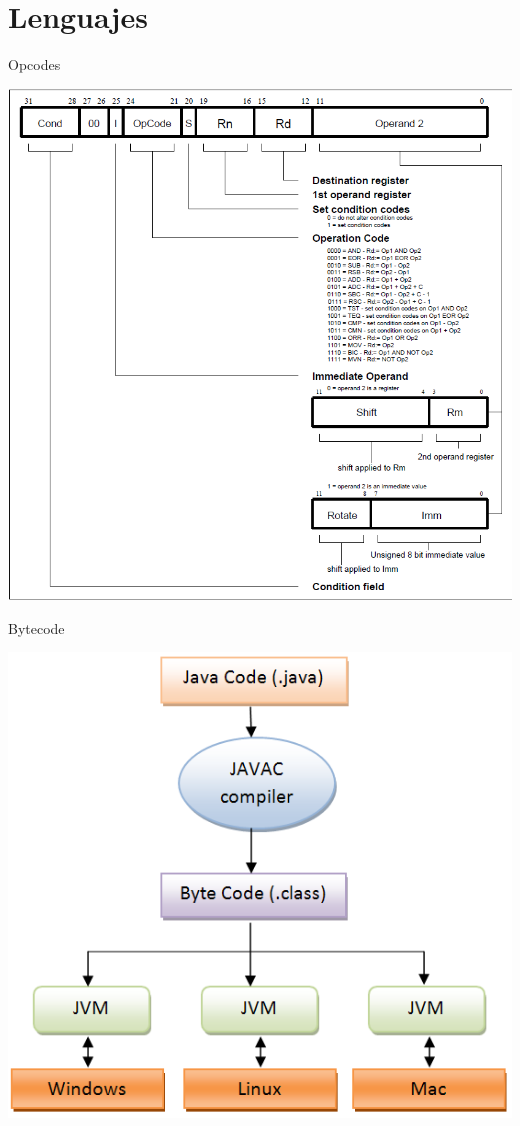 \documentclass{beamer}
\begin{document}
\section{Lenguajes}

\begin{frame}{Opcodes}

\begin{center}
\includegraphics[scale=0.3]{0cPOx.png}
\end{center}

\end{frame}

\begin{frame}{Bytecode}

\begin{center}
\includegraphics[scale=0.3]{java-program-execution2.png}
\end{center}

\end{frame}
\end{document}
